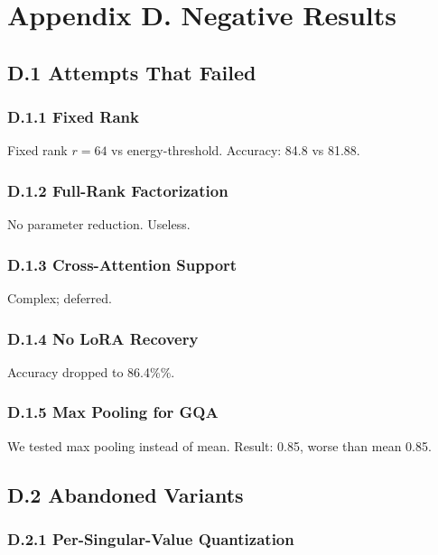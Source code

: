 
\section{Appendix D. Negative Results}

\subsection{D.1 Attempts That Failed}

\subsubsection{D.1.1 Fixed Rank}

Fixed rank $r = 64$ vs energy-threshold. Accuracy: 84.8 vs 81.88.

\subsubsection{D.1.2 Full-Rank Factorization}

No parameter reduction. Useless.

\subsubsection{D.1.3 Cross-Attention Support}

Complex; deferred.

\subsubsection{D.1.4 No LoRA Recovery}

Accuracy dropped to 86.4\%\%.

\subsubsection{D.1.5 Max Pooling for GQA}

We tested max pooling instead of mean. Result: 0.85, worse than mean 
0.85.

\subsection{D.2 Abandoned Variants}

\subsubsection{D.2.1 Per-Singular-Value Quantization}

